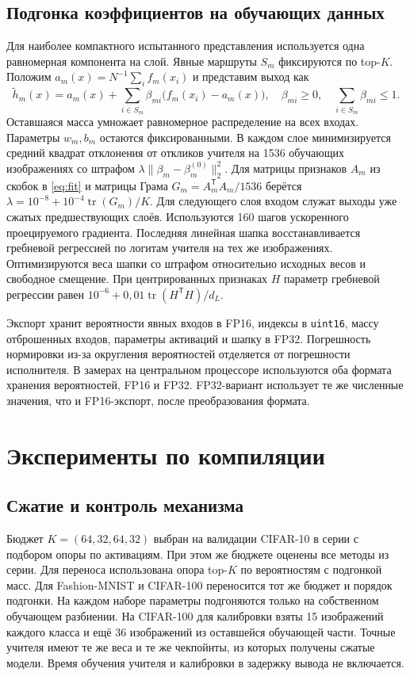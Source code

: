 \documentclass[11pt,a4paper]{article}
\begin{document}
\subsection{Подгонка коэффициентов на обучающих данных}
Для наиболее компактного испытанного представления используется одна равномерная компонента на слой. Явные маршруты $S_m$ фиксируются по top-$K$. Положим $a_m(x)=N^{-1}\sum_i f_m(x_i)$ и представим выход как
\begin{equation}
 \widetilde h_m(x)=a_m(x)+\sum_{i\in S_m}\beta_{mi}\bigl(f_m(x_i)-a_m(x)\bigr),
 \quad \beta_{mi}\ge 0,\quad \sum_{i\in S_m}\beta_{mi}\le 1.
 \label{eq:fit}
\end{equation}
Оставшаяся масса умножает равномерное распределение на всех входах. Параметры $w_m,b_m$ остаются фиксированными. В каждом слое минимизируется средний квадрат отклонения от откликов учителя на 1536 обучающих изображениях со штрафом $\lambda\|\beta_m-\beta_m^{(0)}\|_2^2$. Для матрицы признаков $A_m$ из скобок в \eqref{eq:fit} и матрицы Грама $G_m=A_m^\mathsf{T}A_m/1536$ берётся $\lambda=10^{-8}+10^{-4}\operatorname{tr}(G_m)/K$. Для следующего слоя входом служат выходы уже сжатых предшествующих слоёв. Используются 160 шагов ускоренного проецируемого градиента. Последняя линейная шапка восстанавливается гребневой регрессией по логитам учителя на тех же изображениях. Оптимизируются веса шапки со штрафом относительно исходных весов и свободное смещение. При центрированных признаках $H$ параметр гребневой регрессии равен $10^{-6}+0{,}01\operatorname{tr}(H^\mathsf{T}H)/d_L$.

Экспорт хранит вероятности явных входов в FP16, индексы в \texttt{uint16}, массу отброшенных входов, параметры активаций и шапку в FP32. Погрешность нормировки из-за округления вероятностей отделяется от погрешности исполнителя. В замерах на центральном процессоре используются оба формата хранения вероятностей, FP16 и FP32. FP32-вариант использует те же численные значения, что и FP16-экспорт, после преобразования формата.

\section{Эксперименты по компиляции}
\subsection{Сжатие и контроль механизма}
Бюджет $K=(64,32,64,32)$ выбран на валидации CIFAR-10 в серии с подбором опоры по активациям. При этом же бюджете оценены все методы из серии. Для переноса использована опора top-$K$ по вероятностям с подгонкой масс. Для Fashion-MNIST и CIFAR-100 переносится тот же бюджет и порядок подгонки. На каждом наборе параметры подгоняются только на собственном обучающем разбиении. На CIFAR-100 для калибровки взяты 15 изображений каждого класса и ещё 36 изображений из оставшейся обучающей части. Точные учителя имеют те же веса и те же чекпойнты, из которых получены сжатые модели. Время обучения учителя и калибровки в задержку вывода не включается.
\end{document}
